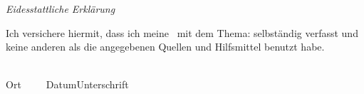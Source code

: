 

\newpage
\thispagestyle{empty}
\begin{center}
\Huge\emph{Eidesstattliche Erklärung}
\end{center}
\medskip
\noindent
Ich versichere hiermit, dass ich meine \Titel\ mit
dem Thema: \glqq \Was \grqq{ }selbständig verfasst und keine anderen als die angegebenen Quellen und Hilfsmittel benutzt habe.

\vspace{3cm}
\noindent
\underline{\hspace{4cm}}\hfill\underline{\hspace{6cm}}\\
Ort~~~~~Datum\hfill Unterschrift\hspace{4cm}

\vfill

\endinput
